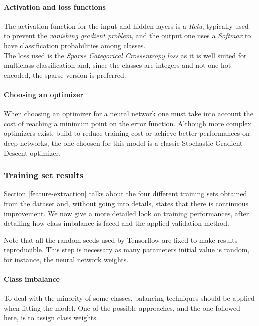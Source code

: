 \paragraph{Activation and loss functions}
The activation function for the input and hidden layers is a \emph{Relu}, 
typically used to prevent the \emph{vanishing gradient problem}, 
and the output one uses a \emph{Softmax} to have classification probabilities
among classes.~\cite{relu}\cite{soft}\cite{vanishing}\\
The loss used is the \emph{Sparse Categorical Crossentropy loss} as it 
is well suited for multiclass classification and, since 
the classes are integers and not one-hot encoded, the sparse version is preferred.~\cite{entropy}

\paragraph{Choosing an optimizer}
When choosing an optimizer for a neural network one must take into account the 
cost of reaching a minimum point on the error function.
Although more complex optimizers exist, build to reduce training 
cost or achieve better performances on deep networks, the one choosen 
for this model is a classic Stochastic Gradient Descent optimizer.

\subsubsection{Training set results}

Section \vref{feature-extraction} talks about the four different 
training sets obtained from the dataset and, without going into details, 
states that there is continuous improvement. 
We now give a more detailed look on training performances, after 
detailing how class imbalance is faced and the applied validation method.

Note that all the random seeds used by Tensorflow are fixed 
to make results reproducible. This step is necessary as many parameters initial 
value is random, for instance, the neural network weights.

\paragraph{Class imbalance}
To deal with the minority of some classes, balancing techniques should be 
applied when fitting the model. One of the possible approaches, and the one followed
here, is to assign class weights. 

